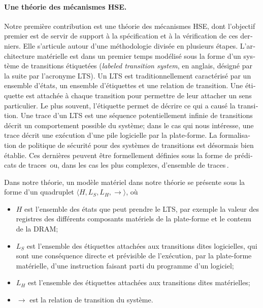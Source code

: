 \begin{otherlanguage}{french}
  \paragraph{Une théorie des mécanismes HSE.}
  Notre première contribution est une théorie des mécanismes HSE, dont
  l’objectif premier est de servir de support à la spécification et à la
  vérification de ces derniers.
  Elle s’articule autour d’une méthodologie divisée en plusieurs étapes.
  L’architecture matérielle est dans un premier temps modélisé sous la forme
  d’un système de transitions étiquetées (\emph{labeled transition system}, en
  anglais, désigné par la suite par l’acronyme LTS).
  Un LTS est traditionnellement caractérisé par un ensemble d’états, un ensemble
  d’étiquettes et une relation de transition.
  Une étiquette est attachée à chaque transition pour permettre de leur attacher
  un sens particulier.
  Le plus souvent, l’étiquette permet de décrire ce qui a causé la transition.
  Une trace d’un LTS est une séquence potentiellement infinie de transitions
  décrit un comportement possible du système; dans le cas qui nous intéresse,
  une trace décrit une exécution d’une pile logicielle par la plate-forme.
  La formalisation de politique de sécurité pour des systèmes de transitions est
  désormais bien établie.
  Ces dernières peuvent être formellement définies sous la forme de prédicats de
  traces\,\cite{lamport1977proving,lamport1985logical,lamport1985logical,alpern1985liveness}
  ou, dans les cas les plus complexes, d’ensemble de
  traces\,\cite{clarkson2010hyperproperties}.

  Dans notre théorie, un modèle matériel dans notre théorie se présente sous la
  forme d’un quadruplet \( \langle H, L_S, L_H, \rightarrow \rangle \), où
  \begin{itemize}
  \item \( H \) est l’ensemble des états que peut prendre le LTS, par exemple la
    valeur des registres des différents composants matériels de la plate-forme
    et le contenu de la DRAM;
  \item \( L_S \) est l’ensemble des étiquettes attachées aux transitions dites
    logicielles, qui sont une conséquence directe et prévisible de l’exécution,
    par la plate-forme matérielle, d’une instruction faisant parti du programme
    d’un logiciel;
  \item \( L_H \) est l’ensemble des étiquettes attachées aux transitions dites
    matérielles;
  \item \( \rightarrow \) est la relation de transition du système.
  \end{itemize}


\end{otherlanguage}
